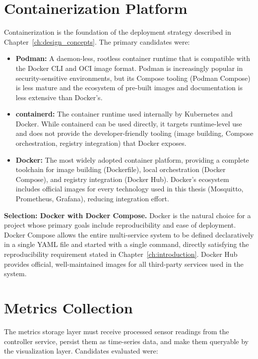 \section{Containerization Platform}

Containerization is the foundation of the deployment strategy described in Chapter~\ref{ch:design_concepts}. The primary candidates were:

\begin{itemize}
    \item \textbf{Podman:} A daemon-less, rootless container runtime that is compatible with the Docker CLI and OCI image format. Podman is increasingly popular in security-sensitive environments, but its Compose tooling (Podman Compose) is less mature and the ecosystem of pre-built images and documentation is less extensive than Docker's.
    \item \textbf{containerd:} The container runtime used internally by Kubernetes and Docker. While containerd can be used directly, it targets runtime-level use and does not provide the developer-friendly tooling (image building, Compose orchestration, registry integration) that Docker exposes.
    \item \textbf{Docker:} The most widely adopted container platform, providing a complete toolchain for image building (Dockerfile), local orchestration (Docker Compose), and registry integration (Docker Hub)\cite{dockerDev}. Docker's ecosystem includes official images for every technology used in this thesis (Mosquitto, Prometheus, Grafana), reducing integration effort.
\end{itemize}

\textbf{Selection: Docker with Docker Compose.} Docker is the natural choice for a project whose primary goals include reproducibility and ease of deployment. Docker Compose allows the entire multi-service system to be defined declaratively in a single YAML file and started with a single command, directly satisfying the reproducibility requirement stated in Chapter~\ref{ch:introduction}. Docker Hub provides official, well-maintained images for all third-party services used in the system\cite{Pahl2015}.

\section{Metrics Collection}

The metrics storage layer must receive processed sensor readings from the controller service, persist them as time-series data, and make them queryable by the visualization layer. Candidates evaluated were:

